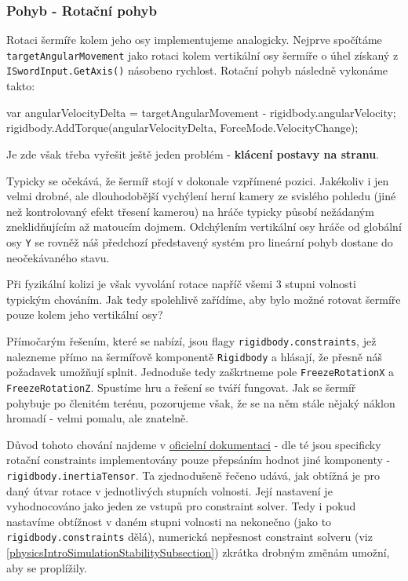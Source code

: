\subsubsection*{Pohyb - Rotační pohyb}
Rotaci šermíře kolem jeho osy implementujeme analogicky. Nejprve spočítáme \texttt{targetAngularMovement} jako rotaci kolem vertikální osy šermíře o úhel získaný z \texttt{ISwordInput.GetAxis()} násobeno rychlost. Rotační pohyb následně vykonáme takto:

\begin{code}
 var angularVelocityDelta = 
     targetAngularMovement - rigidbody.angularVelocity;
 rigidbody.AddTorque(angularVelocityDelta, ForceMode.VelocityChange);
\end{code}

Je zde však třeba vyřešit ještě jeden problém - \textbf{klácení postavy na stranu}. 

Typicky se očekává, že šermíř stojí v dokonale vzpřímené pozici. Jakékoliv i jen velmi drobné, ale dlouhodobější vychýlení herní kamery ze svislého pohledu (jiné než kontrolovaný efekt třesení kamerou) na hráče typicky působí nežádaným zneklidňujícím až matoucím dojmem. Odchýlením vertikální osy hráče od globální osy \texttt{Y} se rovněž náš předchozí představený systém pro lineární pohyb dostane do neočekávaného stavu. 

Při fyzikální kolizi je však vyvolání rotace napříč všemi 3 stupni volnosti typickým chováním. Jak tedy spolehlivě zařídíme, aby bylo možné rotovat šermíře pouze kolem jeho vertikální osy?

Přímočarým řešením, které se nabízí, jsou flagy \texttt{rigidbody.constraints}, jež nalezneme přímo na šermířově komponentě \texttt{Rigidbody} a hlásají, že přesně náš požadavek umožňují splnit. Jednoduše tedy zaškrtneme pole \texttt{FreezeRotationX} a \texttt{FreezeRotationZ}. Spustíme hru a řešení se tváří fungovat. Jak se šermíř pohybuje po členitém terénu, pozorujeme však, že se na něm stále nějaký náklon hromadí - velmi pomalu, ale znatelně.

Důvod tohoto chování najdeme v \href{https://docs.unity3d.com/2022.2/Documentation/ScriptReference/Rigidbody-inertiaTensor.html}{oficielní dokumentaci} \cite{Unity} - dle té jsou specificky rotační constraints implementovány pouze přepsáním hodnot jiné komponenty - \texttt{rigidbody.inertiaTensor}. Ta zjednodušeně řečeno udává, jak obtížná je pro daný útvar rotace v jednotlivých stupních volnosti. Její nastavení je vyhodnocováno jako jeden ze vstupů pro constraint solver. Tedy i pokud nastavíme obtížnost v daném stupni volnosti na nekonečno (jako to \texttt{rigidbody.constraints} dělá), numerická nepřesnost constraint solveru (viz \ref{physicsIntroSimulationStabilitySubsection}) zkrátka drobným změnám umožní, aby se proplížily.

